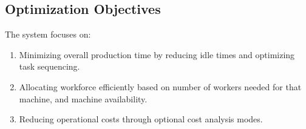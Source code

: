 \subsection{Optimization Objectives}

The system focuses on:
\begin{enumerate}
    \item Minimizing overall production time by reducing idle times and optimizing task sequencing.
    \item Allocating workforce efficiently based on number of workers needed for that machine, and machine availability.
    \item Reducing operational costs through optional cost analysis modes.
\end{enumerate}

% 
% 


